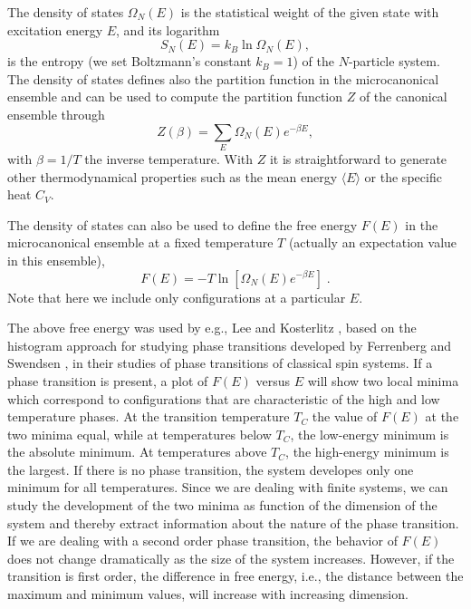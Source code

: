\documentclass{elsart}
\begin{document}
The density of states $\Omega_N(E)$ is the statistical
weight of the given state with excitation energy $E$, and its logarithm
\begin{equation}
      S_N(E)=k_B\ln\Omega_N(E),  \label{eq:entromicro}
\end{equation}
is the entropy (we set Boltzmann's constant
$k_B=1$) of the $N$-particle system.  
The density of states defines also the partition function in the 
microcanonical ensemble and can be used to compute the 
partition function $Z$ of the canonical ensemble through
\begin{equation}
    Z(\beta)=\sum_E\Omega_N(E)e^{-\beta E},
    \label{eq:canonicalpart}
\end{equation}
with $\beta=1/T$ 
the inverse temperature.  With $Z$ it is straightforward to 
generate other thermodynamical
properties such as the mean energy 
$\langle E\rangle$ or the specific heat $C_V$.

The density of states can also be used to define 
the  free energy $F(E)$ in the microcanonical ensemble 
at a fixed temperature $T$ (actually an expectation value in this ensemble), 
\begin{equation}
    F(E)=-T\ln\left[\Omega_N(E)e^{-\beta E}\right]\;.
    \label{eq:freenergy}
\end{equation}
Note that here we include only
configurations at a particular $E$.
 
The above free energy was used by e.g.,
Lee and Kosterlitz \cite{prl90},
based on the histogram approach for studying
phase transitions developed by Ferrenberg and Swendsen \cite{fs88},
in their studies of phase transitions
of classical spin systems. 
If a phase transition is present, a plot of $F(E)$ versus $E$ will show
two local minima which correspond to configurations that are
characteristic of the high and low temperature phases.
At the transition temperature $T_C$ the value of $F(E)$ at the 
two minima equal, while at temperatures below $T_C$, the low-energy
minimum is the absolute minimum. At temperatures above $T_C$, the high-energy
minimum is the largest. If there is no
phase transition, the system developes only one minimum for all temperatures.
Since we are dealing with finite systems, we can study the development 
of the two minima as function of the dimension of the system and thereby 
extract information about the nature of the phase transition. If we are dealing
with a second order phase transition, the behavior of $F(E)$ does not change
dramatically as the size of the system increases. However, if the transition
is first order, the difference in free energy, i.e., 
the distance between the maximum and minimum values, 
will increase with increasing dimension. 
\end{document}
